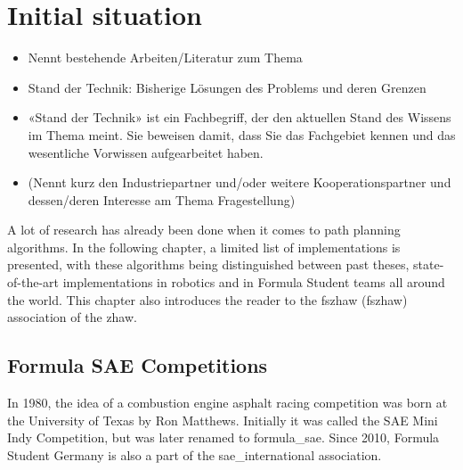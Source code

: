 \section{Initial situation}

\begin{itemize}
    \item Nennt bestehende Arbeiten/Literatur zum Thema
    \item Stand der Technik: Bisherige Lösungen des Problems und deren Grenzen
    \item «Stand der Technik» ist ein Fachbegriff, der den aktuellen Stand des Wissens im Thema meint. Sie beweisen damit, dass Sie das Fachgebiet kennen und das wesentliche Vorwissen aufgearbeitet haben.
    \item (Nennt kurz den Industriepartner und/oder weitere Kooperationspartner und dessen/deren Interesse am Thema Fragestellung)
\end{itemize}

A lot of research has already been done when it comes to path planning algorithms. In the following chapter, a limited list of implementations is presented, with these algorithms being distinguished between past theses, state-of-the-art implementations in robotics and in Formula Student teams all around the world. This chapter also introduces the reader to the \acrlong{fszhaw} (\acrshort{fszhaw}) association of the \acrlong{zhaw}.

\subsection{Formula SAE Competitions}

In 1980, the idea of a combustion engine asphalt racing competition was born at the University of Texas by Ron Matthews. Initially it was called the SAE Mini Indy Competition, but was later renamed to \Gls{formula_sae}. Since 2010, Formula Student Germany is also a part of the \Gls{sae_international} association.
\cite{formula_sae}

